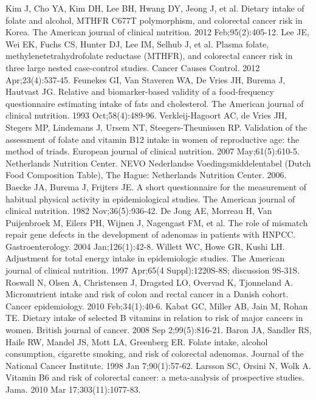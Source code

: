 \begin{thebibliography}{12}
		Kim J, Cho YA, Kim DH, Lee BH, Hwang DY, Jeong J, et al. Dietary intake of folate and alcohol, MTHFR C677T polymorphism, and colorectal cancer risk in Korea. The American journal of clinical nutrition. 2012 Feb;95(2):405-12. 
		Lee JE, Wei EK, Fuchs CS, Hunter DJ, Lee IM, Selhub J, et al. Plasma folate, methylenetetrahydrofolate reductase (MTHFR), and colorectal cancer risk in three large nested case-control studies. Cancer Causes Control. 2012 Apr;23(4):537-45. 
		Feunekes GI, Van Staveren WA, De Vries JH, Burema J, Hautvast JG. Relative and biomarker-based validity of a food-frequency questionnaire estimating intake of fats and cholesterol. The American journal of clinical nutrition. 1993 Oct;58(4):489-96. 
		Verkleij-Hagoort AC, de Vries JH, Stegers MP, Lindemans J, Ursem NT, Steegers-Theunissen RP. Validation of the assessment of folate and vitamin B12 intake in women of reproductive age: the method of triads. European journal of clinical nutrition. 2007 May;61(5):610-5. 
		Netherlands Nutrition Center. NEVO Nederlandse Voedingsmiddelentabel (Dutch Food Composition Table), The Hague: Netherlands Nutrition Center. 2006.
		Baecke JA, Burema J, Frijters JE. A short questionnaire for the measurement of habitual physical activity in epidemiological studies. The American journal of clinical nutrition. 1982 Nov;36(5):936-42. 
		De Jong AE, Morreau H, Van Puijenbroek M, Eilers PH, Wijnen J, Nagengast FM, et al. The role of mismatch repair gene defects in the development of adenomas in patients with HNPCC. Gastroenterology. 2004 Jan;126(1):42-8. 
		Willett WC, Howe GR, Kushi LH. Adjustment for total energy intake in epidemiologic studies. The American journal of clinical nutrition. 1997 Apr;65(4 Suppl):1220S-8S; discussion 9S-31S. 
		Roswall N, Olsen A, Christensen J, Dragsted LO, Overvad K, Tjonneland A. Micronutrient intake and risk of colon and rectal cancer in a Danish cohort. Cancer epidemiology. 2010 Feb;34(1):40-6. 
		Kabat GC, Miller AB, Jain M, Rohan TE. Dietary intake of selected B vitamins in relation to risk of major cancers in women. British journal of cancer. 2008 Sep 2;99(5):816-21. 
		Baron JA, Sandler RS, Haile RW, Mandel JS, Mott LA, Greenberg ER. Folate intake, alcohol consumption, cigarette smoking, and risk of colorectal adenomas. Journal of the National Cancer Institute. 1998 Jan 7;90(1):57-62. 
		Larsson SC, Orsini N, Wolk A. Vitamin B6 and risk of colorectal cancer: a meta-analysis of prospective studies. Jama. 2010 Mar 17;303(11):1077-83. 

\end{thebibliography}
